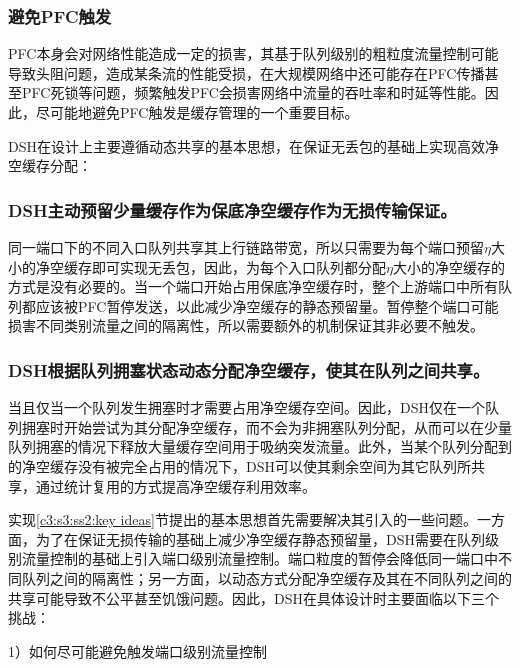 \subsubsection{避免PFC触发}

PFC本身会对网络性能造成一定的损害，其基于队列级别的粗粒度流量控制可能导致头阻问题，造成某条流的性能受损，在大规模网络中还可能存在PFC传播甚至PFC死锁等问题，频繁触发PFC会损害网络中流量的吞吐率和时延等性能。因此，尽可能地避免PFC触发是缓存管理的一个重要目标。

\label{c3:s3:ss2:key ideas}

DSH在设计上主要遵循动态共享的基本思想，在保证无丢包的基础上实现高效净空缓存分配：

\subsubsection{DSH主动预留少量缓存作为保底净空缓存作为无损传输保证。}

同一端口下的不同入口队列共享其上行链路带宽，所以只需要为每个端口预留$\eta$大小的净空缓存即可实现无丢包，因此，为每个入口队列都分配$\eta$大小的净空缓存的方式是没有必要的。当一个端口开始占用保底净空缓存时，整个上游端口中所有队列都应该被PFC暂停发送，以此减少净空缓存的静态预留量。暂停整个端口可能损害不同类别流量之间的隔离性，所以需要额外的机制保证其非必要不触发。

\subsubsection{DSH根据队列拥塞状态动态分配净空缓存，使其在队列之间共享。}

当且仅当一个队列发生拥塞时才需要占用净空缓存空间。因此，DSH仅在一个队列拥塞时开始尝试为其分配净空缓存，而不会为非拥塞队列分配，从而可以在少量队列拥塞的情况下释放大量缓存空间用于吸纳突发流量。此外，当某个队列分配到的净空缓存没有被完全占用的情况下，DSH可以使其剩余空间为其它队列所共享，通过统计复用的方式提高净空缓存利用效率。


实现\ref{c3:s3:ss2:key ideas}节提出的基本思想首先需要解决其引入的一些问题。一方面，为了在保证无损传输的基础上减少净空缓存静态预留量，DSH需要在队列级别流量控制的基础上引入端口级别流量控制。端口粒度的暂停会降低同一端口中不同队列之间的隔离性；另一方面，以动态方式分配净空缓存及其在不同队列之间的共享可能导致不公平甚至饥饿问题。因此，DSH在具体设计时主要面临以下三个挑战：

1）如何尽可能避免触发端口级别流量控制

